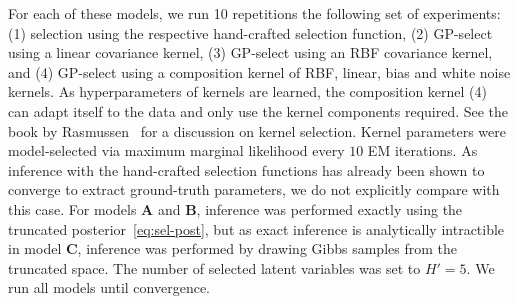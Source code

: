 For each of these models, we run 10 repetitions the following set of experiments: (1) selection using the respective hand-crafted selection function,
(2) GP-select using a linear covariance kernel, (3) GP-select using an RBF covariance kernel, and (4) GP-select using a composition kernel of RBF, linear, bias and white noise kernels.
As hyperparameters of kernels are learned, the composition kernel (4) can adapt itself to the data and only use the kernel components required. 
See the book by Rasmussen~\citep{RasmussenGPbook} for a discussion on kernel selection.
Kernel parameters were model-selected via maximum marginal likelihood every $10$ EM iterations.
As inference with the hand-crafted selection functions has already been shown to converge to extract ground-truth parameters, we do not explicitly compare with this case.
For models \textbf{A} and \textbf{B}, inference was performed exactly using the truncated posterior~\eqref{eq:sel-post}, but as exact inference is analytically intractible in model \textbf{C}, inference was performed by drawing Gibbs samples from the truncated space.
The number of selected latent variables was set to $H'=5$.
%
We run all models until convergence. %

